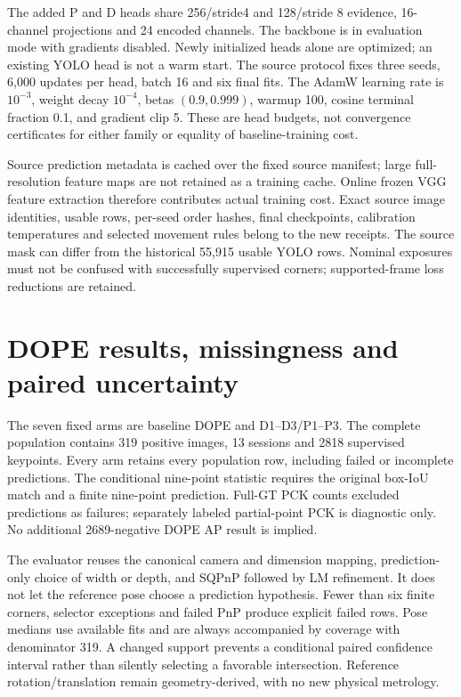\documentclass[10pt]{article}
\begin{document}
The added P and D heads share 256/stride4 and 128/stride 8 evidence, 16-channel projections and 24 encoded channels. The backbone is in evaluation mode with gradients disabled. Newly initialized heads alone are optimized; an existing YOLO head is not a warm start. The source protocol fixes three seeds, 6,000 updates per head, batch 16 and six final fits. The AdamW learning rate is $10^{-3}$, weight decay $10^{-4}$, betas $(0.9,0.999)$, warmup 100, cosine terminal fraction 0.1, and gradient clip 5. These are head budgets, not convergence certificates for either family or equality of baseline-training cost.

Source prediction metadata is cached over the fixed source manifest; large full-resolution feature maps are not retained as a training cache. Online frozen VGG feature extraction therefore contributes actual training cost. Exact source image identities, usable rows, per-seed order hashes, final checkpoints, calibration temperatures and selected movement rules belong to the new receipts. The source mask can differ from the historical 55,915 usable YOLO rows. Nominal exposures must not be confused with successfully supervised corners; supported-frame loss reductions are retained.

\section{DOPE results, missingness and paired uncertainty}



The seven fixed arms are baseline DOPE and D1--D3/P1--P3. The complete population contains 319 positive images, 13 sessions and 2818 supervised keypoints. Every arm retains every population row, including failed or incomplete predictions. The conditional nine-point statistic requires the original box-IoU match and a finite nine-point prediction. Full-GT PCK counts excluded predictions as failures; separately labeled partial-point PCK is diagnostic only. No additional 2689-negative DOPE AP result is implied.

The evaluator reuses the canonical camera and dimension mapping, prediction-only choice of width or depth, and SQPnP followed by LM refinement. It does not let the reference pose choose a prediction hypothesis. Fewer than six finite corners, selector exceptions and failed PnP produce explicit failed rows. Pose medians use available fits and are always accompanied by coverage with denominator 319. A changed support prevents a conditional paired confidence interval rather than silently selecting a favorable intersection. Reference rotation/translation remain geometry-derived, with no new physical metrology.
\end{document}
